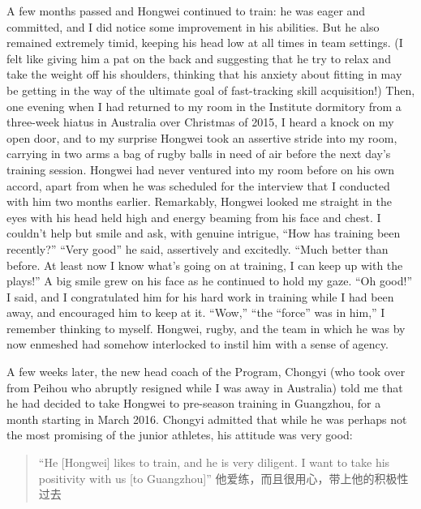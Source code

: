 A few months passed and Hongwei continued to train: he was eager and committed, and I did notice some improvement in his abilities. But he also remained extremely timid, keeping his head low at all times in team settings.  (I felt like giving him a pat on the back and suggesting that he try to relax and take the weight off his shoulders, thinking that his anxiety about fitting in may be getting in the way of the ultimate goal of fast-tracking skill acquisition!)  Then, one evening when I had returned to my room in the Institute dormitory from a three-week hiatus in Australia over Christmas of 2015, I heard a knock on my open door, and to my surprise Hongwei took an assertive stride into my room, carrying in two arms a bag of rugby balls in need of air before the next day's training session.  Hongwei had never ventured into my room before on his own accord, apart from when he was scheduled for the interview that I conducted with him two months earlier.  Remarkably, Hongwei looked me straight in the eyes with his head held high and energy beaming from his face and chest.  I couldn’t help but smile and ask, with genuine intrigue, ``How has training been recently?''
``Very good'' he said, assertively and excitedly.  ``Much better than before.  At least now I know what’s going on at training, I can keep up with the plays!''  A big smile grew on his face as he continued to hold my gaze.  ``Oh good!'' I said, and I congratulated him for his hard work in training while I had been away, and encouraged him to keep at it. ``Wow,'' ``the ``force'' was in him,'' I remember thinking to myself.  Hongwei, rugby, and the team in which he was by now enmeshed had somehow interlocked to instil him with a sense of agency.


A few weeks later, the new head coach of the Program, Chongyi (who took over from Peihou who abruptly resigned while I was away in Australia) told me that he had decided to take Hongwei to pre-season training in Guangzhou, for a month starting in March 2016.  Chongyi admitted that while he was perhaps not the most promising of the junior athletes, his attitude was very good:

\begin{CJK}{UTF8}{gbsn}
  \begin{quotation}
``He [Hongwei] likes to train, and he is very diligent. I want to take his positivity with us [to Guangzhou]'' 他爱练，而且很用心，带上他的积极性过去
  \end{quotation}
\end{CJK}

